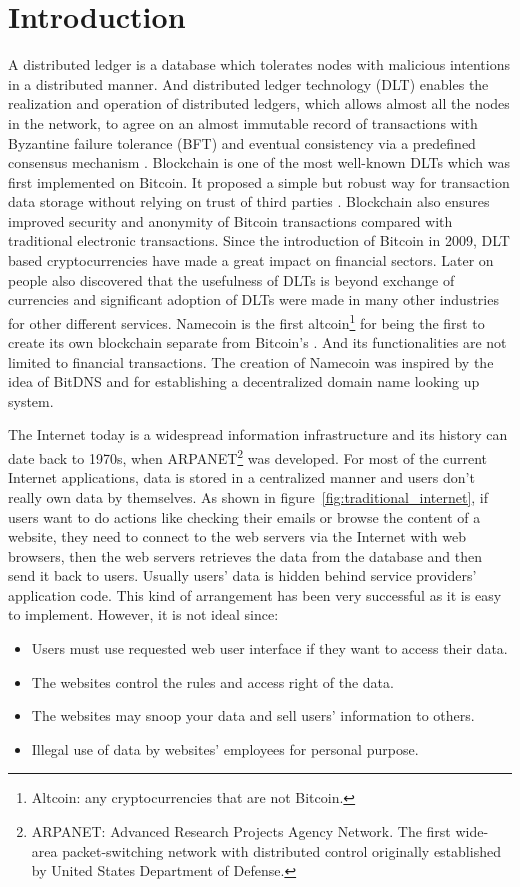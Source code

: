 \section{Introduction}
\label{sec:introduction}

A distributed ledger is a database which tolerates nodes with malicious intentions in a distributed manner.
And distributed ledger technology (DLT) enables the realization and operation of distributed ledgers,
which allows almost all the nodes in the network, to agree on an almost immutable record of transactions with Byzantine failure tolerance (BFT) and eventual consistency via a predefined consensus mechanism \cite{Sunyaev2020}.
Blockchain is one of the most well-known DLTs which was first implemented on Bitcoin. It proposed a simple but robust way for transaction data storage without relying on trust of third parties \cite{nakamoto2008peer}.
Blockchain also ensures improved security and anonymity of Bitcoin transactions compared with traditional electronic transactions.
Since the introduction of Bitcoin in 2009, DLT based cryptocurrencies have made a great impact on financial sectors. Later on people also discovered that the usefulness of DLTs is beyond exchange of currencies and
significant adoption of DLTs were made in many other industries for other different services.
Namecoin is the first altcoin\footnote{Altcoin: any cryptocurrencies that are not Bitcoin.} for being the first to create its own blockchain separate from Bitcoin's \cite{kalodner2015empirical}.
And its functionalities are not limited to financial transactions.
The creation of Namecoin was inspired by the idea of BitDNS \cite{merited2010bitdns} and for establishing a decentralized domain name looking up system.


The Internet today is a widespread information infrastructure and its history can date back to 1970s, when ARPANET\footnote{ARPANET: Advanced Research Projects Agency Network.
    The first wide-area packet-switching network with distributed control originally established by United States Department of Defense.} was developed.
For most of the current Internet applications, data is stored in a centralized manner and users don't really own data by themselves. As shown in figure~\ref{fig:traditional_internet},
if users want to do actions like checking their emails or browse the content of a website, they need to connect to the web servers via the Internet with web browsers, then the web servers retrieves the data from the database and then send it back to users.
Usually users' data is hidden behind service providers' application code. This kind of arrangement has been very successful as it is easy to implement. However, it is not ideal since:
\begin{itemize}
    \item Users must use requested web user interface if they want to access their data.
    \item The websites control the rules and access right of the data.
    \item The websites may snoop your data and sell users' information to others.
    \item Illegal use of data by websites' employees for personal purpose.
\end{itemize}

